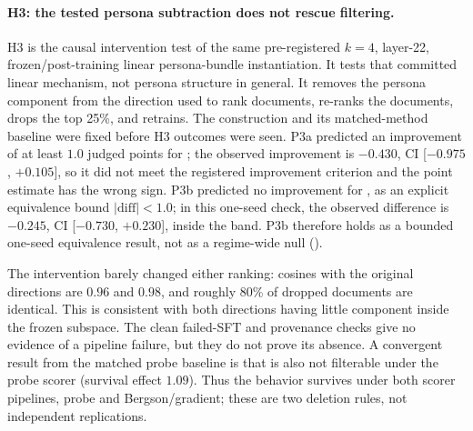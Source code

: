 \paragraph{H3: the tested persona subtraction does not rescue filtering.}
H3 is the causal intervention test of the same pre-registered $k=4$,
layer-22, frozen/post-training linear persona-bundle instantiation. It
tests that committed linear mechanism, not persona structure in general. It
removes the persona component from the direction used to rank documents,
re-ranks the
documents, drops the top 25\%, and retrains. The construction and its
matched-method baseline were fixed before H3 outcomes were seen. P3a
predicted an improvement of at least $1.0$ judged points for
; the observed improvement is $-0.430$, CI
[$-0.975$, $+0.105$], so it did not meet the registered improvement
criterion and the point estimate has the wrong sign. P3b predicted no
improvement for , as an explicit equivalence bound
$|\text{diff}| < 1.0$; in this one-seed check, the observed difference is
$-0.245$, CI [$-0.730$, $+0.230$], inside the band. P3b therefore holds as
a bounded one-seed equivalence result, not as a regime-wide null
().

The intervention barely changed either ranking: cosines with the original
directions are $0.96$ and $0.98$, and roughly 80\% of dropped documents are
identical. This is consistent with both directions having little component
inside the frozen subspace. The clean failed-SFT and provenance checks give
no evidence of a pipeline failure, but they do not prove its absence. A
convergent result
from the matched probe baseline is that  is also not
filterable under the probe scorer (survival effect $1.09$). Thus the
behavior survives under both scorer pipelines, probe and Bergson/gradient;
these are two deletion rules, not independent replications.
